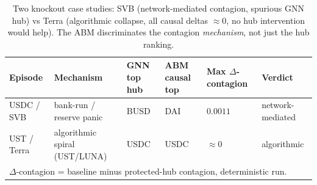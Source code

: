 \begin{table}[t]
\caption{Two knockout case studies: SVB (network-mediated contagion, spurious GNN hub)
vs Terra (algorithmic collapse, all causal deltas $\approx 0$, no hub intervention would help).
The ABM discriminates the contagion \emph{mechanism}, not just the hub ranking.}
\label{tab:twocasestudies}
\small
\setlength{\tabcolsep}{4pt}
\begin{tabular}{llllll}
\toprule
Episode & Mechanism & GNN top hub & ABM causal top & Max $\Delta$-contagion & Verdict \\
\midrule
USDC / SVB & bank-run / reserve panic & BUSD & DAI & $0.0011$ & network-mediated \\
UST / Terra & algorithmic spiral (UST/LUNA) & USDC & USDC & $\approx 0$ & algorithmic \\
\bottomrule
\multicolumn{6}{l}{\footnotesize $\Delta$-contagion = baseline minus protected-hub contagion, deterministic run.}
\end{tabular}
\end{table}
